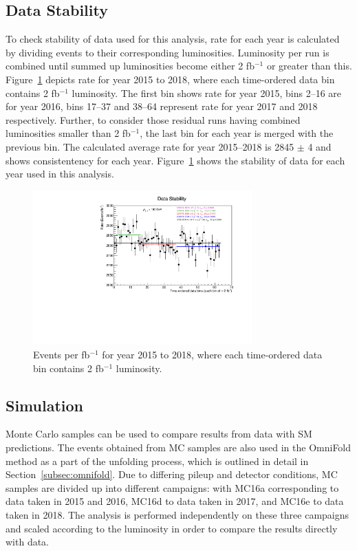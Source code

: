 \subsection{Data Stability}
To check stability of data used for this analysis, rate for each year is calculated by dividing events to their corresponding luminosities. Luminosity per run is combined until summed up luminosities become either 2 fb$^{-1}$ or greater than this. Figure~\ref{fig:DataStability} depicts rate for year 2015 to 2018, where each time-ordered data bin contains 2 fb$^{-1}$ luminosity. The first bin shows rate for year 2015, bins 2--16 are for year 2016, bins 17--37 and 38--64 represent rate for year 2017 and 2018 respectively. Further, to consider those residual runs having combined luminosities smaller than 2 fb$^{-1}$, the last bin for each year is merged with the previous bin. The calculated average rate for year 2015--2018 is 2845 $\pm$ 4 and shows consistentency for each year. Figure~\ref{fig:DataStability} shows the stability of data for each year used in this analysis.
\begin{figure}[h!]
\centering
\includegraphics[width=0.75\textwidth]{figures/DataStability.pdf}
\caption{Events per fb$^{-1}$ for year 2015 to 2018, where each time-ordered data bin contains 2 fb$^{-1}$ luminosity.}
\label{fig:DataStability}
\end{figure}

\subsection{Simulation}
Monte Carlo samples can be used to compare results from data with SM predictions. The events obtained from MC samples are also used in the OmniFold method as a part of the unfolding process, which is outlined in detail in Section~\ref{subsec:omnifold}.
Due to differing pileup and detector conditions, MC samples are divided up into different campaigns: with MC16a corresponding to data taken in 2015 and 2016, MC16d to data taken in 2017, and MC16e to data taken in 2018. The analysis is performed independently
on these three campaigns and scaled according to the luminosity in order to compare the results directly with data.

